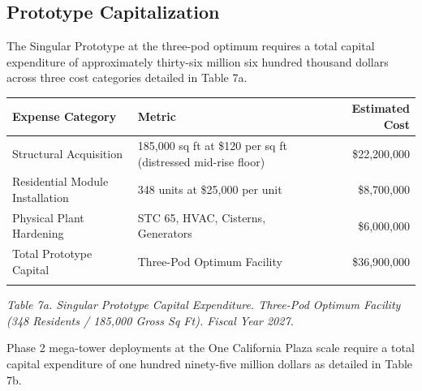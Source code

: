 \documentclass[12pt, letterpaper]{article}
\begin{document}
\subsection{Prototype Capitalization}

The Singular Prototype at the three-pod optimum requires a total capital expenditure of approximately thirty-six million six hundred thousand dollars across three cost categories detailed in Table 7a.

{\singlespacing
\begin{tabularx}{\textwidth}{@{}lXr@{}}
\toprule
\rowcolor{rowgray}
Expense Category & Metric & Estimated Cost \\
\midrule
Structural Acquisition & 185,000 sq ft at \$120 per sq ft (distressed mid-rise floor) & \$22,200,000 \\
\rowcolor{rowgray}
Residential Module Installation & 348 units at \$25,000 per unit & \$8,700,000 \\
Physical Plant Hardening & STC 65, HVAC, Cisterns, Generators & \$6,000,000 \\
\midrule
Total Prototype Capital & Three-Pod Optimum Facility & \$36,900,000 \\
\addlinespace[4pt]
\bottomrule
\end{tabularx}\par
\vspace{8pt}
\noindent\textit{Table 7a. Singular Prototype Capital Expenditure. Three-Pod Optimum Facility (348 Residents / 185,000 Gross Sq Ft). Fiscal Year 2027.}
\par}

Phase 2 mega-tower deployments at the One California Plaza scale require a total capital expenditure of one hundred ninety-five million dollars as detailed in Table 7b.
\end{document}
